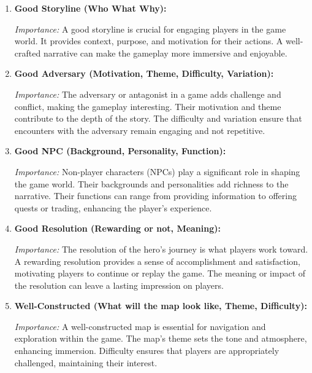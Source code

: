 \documentclass[10pt,twocolumn]{article}
\begin{document}
\begin{enumerate}
    \item \textbf{Good Storyline (Who What Why):}
    
    \textit{Importance:} A good storyline is crucial for engaging players in the game world. It provides context, purpose, and motivation for their actions. A well-crafted narrative can make the gameplay more immersive and enjoyable.\cite{reddit_dnd_campaign_fun}
    
    \item \textbf{Good Adversary (Motivation, Theme, Difficulty, Variation):}
    
    \textit{Importance:} The adversary or antagonist in a game adds challenge and conflict, making the gameplay interesting. Their motivation and theme contribute to the depth of the story. The difficulty and variation ensure that encounters with the adversary remain engaging and not repetitive.\cite{reddit_dnd_campaign_fun}
    
    \item \textbf{Good NPC (Background, Personality, Function):}
    
    \textit{Importance:} Non-player characters (NPCs) play a significant role in shaping the game world. Their backgrounds and personalities add richness to the narrative. Their functions can range from providing information to offering quests or trading, enhancing the player's experience.\cite{reddit_dnd_campaign_fun}
    
    \item \textbf{Good Resolution (Rewarding or not, Meaning):}
    
    \textit{Importance:} The resolution of the hero's journey is what players work toward. A rewarding resolution provides a sense of accomplishment and satisfaction, motivating players to continue or replay the game. The meaning or impact of the resolution can leave a lasting impression on players.\cite{reddit_dmacademy_oneshot}
    
    \item \textbf{Well-Constructed (What will the map look like, Theme, Difficulty):}
    
    \textit{Importance:} A well-constructed map is essential for navigation and exploration within the game. The map's theme sets the tone and atmosphere, enhancing immersion. Difficulty ensures that players are appropriately challenged, maintaining their interest.\cite{reddit_dmacademy_oneshot}
\end{enumerate}
\end{document}
